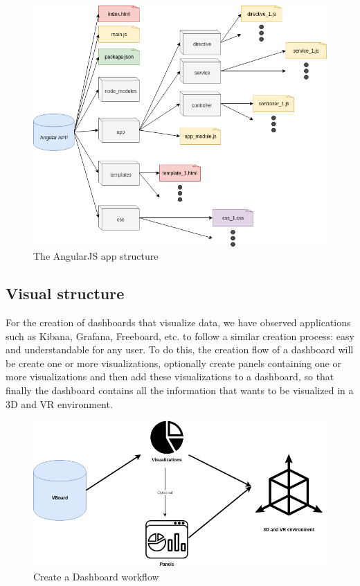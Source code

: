 \documentclass[a4paper, 12pt]{book}
\begin{document}
\begin{figure}[H]
  \centering
  \includegraphics[width=16cm, keepaspectratio]{img/development/Angular_structure}
  \caption{The AngularJS app structure}
  \label{fig:angularjsstructure}
\end{figure}

\subsection{Visual structure}

For the creation of dashboards that visualize data, we have observed applications such as Kibana, Grafana, Freeboard, etc. to follow a similar creation process: easy and understandable for any user. To do this, the creation flow of a dashboard will be create one or more visualizations, optionally create panels containing one or more visualizations and then add these visualizations to a dashboard, so that finally the dashboard contains all the information that wants to be visualized in a 3D and VR environment.

\begin{figure}[H]
  \centering
  \includegraphics[width=16cm, keepaspectratio]{img/development/Workflow}
  \caption{Create a Dashboard workflow}
  \label{fig:dashboardworkflow}
\end{figure}
\end{document}
